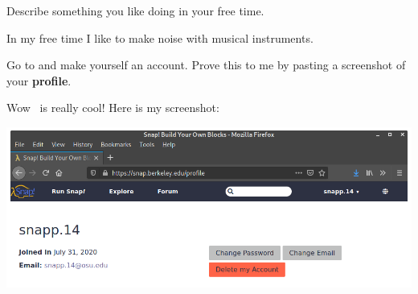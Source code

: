 \documentclass{ximera}
\begin{document}
\begin{question}
\begin{freeResponse}
\begin{center}
    \end{center}
  \end{freeResponse}
\end{question}
\mynewpage

\begin{question}
  Describe something you like doing in your free time.
  \begin{freeResponse}
    In my free time I like to make noise with musical instruments.
  \end{freeResponse}
\end{question}
\mynewpage

\begin{question}
  Go to \flavor and make yourself an account. Prove this to me by
  pasting a screenshot of your \textbf{profile}.
  \begin{freeResponse}
    Wow \snap\ is really cool! Here is my screenshot:
    \begin{center}
      \includegraphics[width=.4\textwidth]{profile.png}
    \end{center}
  \end{freeResponse}
\end{question}
\end{document}
